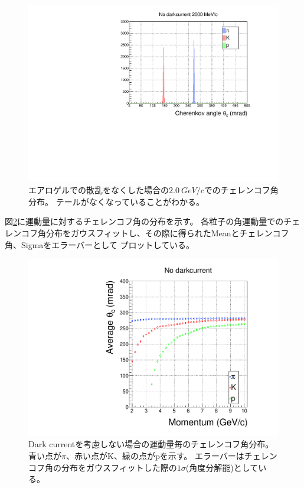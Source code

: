 \begin{figure}[htbp]
  \centering
  \includegraphics[width=15cm, page=1]{images/chapter4/2000MeV_noscatter.pdf}
  \caption{
  エアロゲルでの散乱をなくした場合の$\SI{2.0}{GeV/c}$でのチェレンコフ角分布。
  テールがなくなっていることがわかる。
  }
  \label{fig:cherenkovAngleDistribution3}
\end{figure}
図\ref{fig:angleMultiGraph1}に運動量に対するチェレンコフ角の分布を示す。
各粒子の角運動量でのチェレンコフ角分布をガウスフィットし、その際に得られたMeanとチェレンコフ角、Sigmaをエラーバーとして
プロットしている。
\begin{figure}[htbp]
  \centering
  \includegraphics[width=15cm,page=1]{images/chapter4/angleAndMultiGraph.pdf}
  \caption{
    Dark currentを考慮しない場合の運動量毎のチェレンコフ角分布。青い点が$\pi$、赤い点がK、緑の点がpを示す。
    エラーバーはチェレンコフ角の分布をガウスフィットした際の$1\sigma$(角度分解能)としている。
  }
  \label{fig:angleMultiGraph1}
\end{figure}
